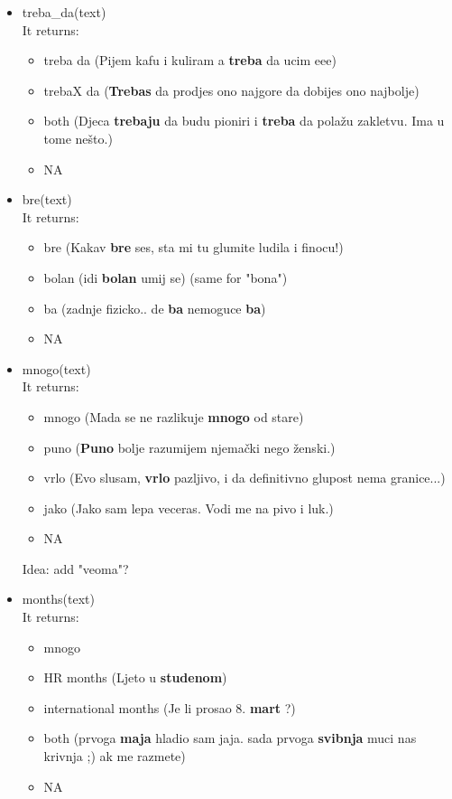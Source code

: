 \documentclass[a4paper]{article}
\begin{document}
\begin{itemize}
\item treba\_da(text)\\
It returns:
\begin{itemize}
\item treba da (Pijem kafu i kuliram a \textbf{treba} da ucim eee)
\item trebaX da (\textbf{Trebas }da prodjes ono najgore da dobijes ono najbolje)
\item both (Djeca \textbf{trebaju} da budu pioniri i \textbf{treba} da polažu zakletvu. Ima u tome nešto.)
\item NA
\end{itemize}


\item bre(text)\\
It returns:
\begin{itemize}
\item bre (Kakav \textbf{bre} ses, sta mi tu glumite ludila i finocu!)
\item bolan (idi \textbf{bolan} umij se) (same for "bona")
\item ba (zadnje fizicko.. de \textbf{ba} nemoguce	\textbf{ba})
\item NA
\end{itemize}

\item mnogo(text)\\
It returns:
\begin{itemize}
\item mnogo (Mada se ne razlikuje \textbf{mnogo} od stare)
\item puno (\textbf{Puno} bolje razumijem njemački nego ženski.)
\item vrlo (Evo slusam, \textbf{vrlo} pazljivo, i da definitivno glupost nema granice...)
\item jako (Jako sam lepa veceras. Vodi me na pivo i luk.)
\item NA
\end{itemize}
Idea: add "veoma"?

\item months(text)\\
It returns:
\begin{itemize}
\item mnogo
\item HR months (Ljeto u \textbf{studenom})
\item international months (Je li prosao 8. \textbf{mart} ?)
\item both (prvoga \textbf{maja} hladio sam jaja. sada prvoga \textbf{svibnja} muci nas krivnja ;) ak me razmete)
\item NA
\end{itemize}


\end{itemize}
\end{document}
